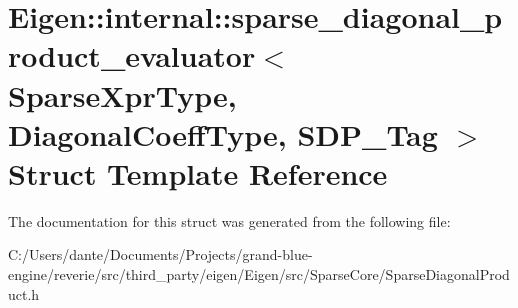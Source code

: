 \hypertarget{struct_eigen_1_1internal_1_1sparse__diagonal__product__evaluator}{}\section{Eigen\+::internal\+::sparse\+\_\+diagonal\+\_\+product\+\_\+evaluator$<$ Sparse\+Xpr\+Type, Diagonal\+Coeff\+Type, S\+D\+P\+\_\+\+Tag $>$ Struct Template Reference}
\label{struct_eigen_1_1internal_1_1sparse__diagonal__product__evaluator}


The documentation for this struct was generated from the following file\+:\begin{DoxyCompactItemize}
\item 
C\+:/\+Users/dante/\+Documents/\+Projects/grand-\/blue-\/engine/reverie/src/third\+\_\+party/eigen/\+Eigen/src/\+Sparse\+Core/Sparse\+Diagonal\+Product.\+h\end{DoxyCompactItemize}
